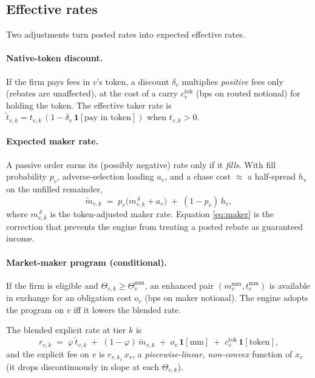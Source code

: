 \documentclass[11pt]{article}
\begin{document}
\subsection{Effective rates}
Two adjustments turn posted rates into expected effective rates.

\paragraph{Native-token discount.} If the firm pays fees in $v$'s token, a
discount $\delta_v$ multiplies \emph{positive} fees only (rebates are
unaffected), at the cost of a carry $c^{\text{tok}}_v$ (bps on routed notional)
for holding the token. The effective taker rate is
$\tilde t_{v,k} = t_{v,k}\,(1-\delta_v\,\mathbf 1[\text{pay in token}])$ when
$t_{v,k}>0$.

\paragraph{Expected maker rate.} A passive order earns its (possibly negative)
rate only if it \emph{fills}. With fill probability $p_v$, adverse-selection
loading $a_v$, and a chase cost $\approx$ a half-spread $h_v$ on the unfilled
remainder,
\begin{equation}
\tilde m_{v,k} \;=\; p_v\bigl(m^{\,\delta}_{v,k} + a_v\bigr) \;+\; (1-p_v)\,h_v,
\label{eq:maker}
\end{equation}
where $m^{\,\delta}_{v,k}$ is the token-adjusted maker rate. Equation
\eqref{eq:maker} is the correction that prevents the engine from treating a
posted rebate as guaranteed income.

\paragraph{Market-maker program (conditional).} If the firm is eligible and
$\Theta_{v,k}\ge \Theta^{\text{mm}}_v$, an enhanced pair
$(m^{\text{mm}}_v,t^{\text{mm}}_v)$ is available in exchange for an obligation
cost $o_v$ (bps on maker notional). The engine adopts the program on $v$ iff it
lowers the blended rate.

The blended explicit rate at tier $k$ is
\begin{equation}
r_{v,k} \;=\; \varphi\,\tilde t_{v,k} \;+\; (1-\varphi)\,\tilde m_{v,k}
\;+\; o_v\,\mathbf 1[\text{mm}] \;+\; c^{\text{tok}}_v\,\mathbf 1[\text{token}],
\label{eq:blend}
\end{equation}
and the explicit fee on $v$ is $r_{v,k_v}\,x_v$, a \emph{piecewise-linear,
non-convex} function of $x_v$ (it drops discontinuously in slope at each
$\Theta_{v,k}$).
\end{document}
